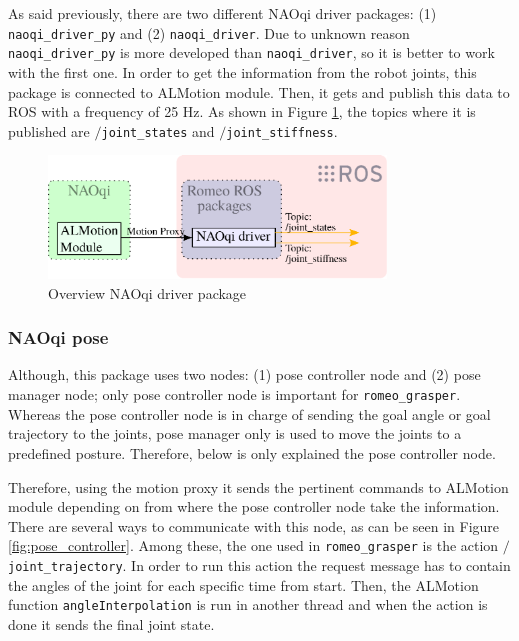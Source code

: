 \documentclass[12pt,a4paper,final,twoside,openright]{report}
\begin{document}
As said previously, there are two different NAOqi driver packages: (1) \texttt{naoqi\_driver\_py} and (2) \texttt{naoqi\_driver}. Due to unknown reason \texttt{naoqi\_driver\_py} is more developed than \texttt{naoqi\_driver}, so it is better to work with the first one. In order to get the information from the robot joints, this package is connected to ALMotion module. Then, it gets and publish this data to ROS with a frequency of 25 Hz. As shown in Figure \ref{fig:naoqi_driver}, the topics where it is published are \texttt{$/$joint\_states} and \texttt{$/$joint\_stiffness}.

\begin{figure}[h]
\centering
\includegraphics[width=0.8\textwidth]{images/naoqi_driver.eps}
\caption{Overview NAOqi driver package\label{fig:naoqi_driver}}
\end{figure}

\subsubsection{NAOqi pose}

Although, this package uses two nodes: (1) pose controller node and (2) pose manager node; only pose controller node is important for \texttt{romeo\_grasper}. Whereas the pose controller node is in charge of sending the goal angle or goal trajectory to the joints, pose manager only is used to move the joints to a predefined posture. Therefore, below is only explained the pose controller node.

Therefore, using the motion proxy it sends the pertinent commands to ALMotion module depending on from where the pose controller node take the information. There are several ways to communicate with this node, as can be seen in Figure \ref{fig:pose_controller}. Among these, the one used in \texttt{romeo\_grasper} is the action \texttt{$/$joint\_trajectory}. In order to run this action the request message has to contain the angles of the joint for each specific time from start. Then, the ALMotion function \texttt{angleInterpolation} is run in another thread and when the action is done it sends the final joint state.
\end{document}
